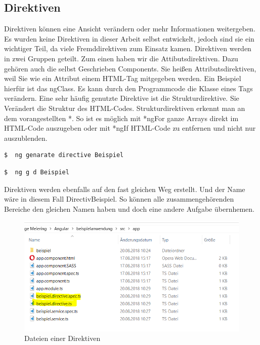 \subsection{Direktiven}
Direktiven können eine Ansicht verändern oder mehr Informationen weitergeben. Es wurden keine Direktiven in dieser Arbeit selbst entwickelt, jedoch sind sie ein wichtiger Teil, da viele Fremddirektiven zum Einsatz kamen. Direktiven werden in zwei Gruppen geteilt. Zum einen haben wir die Attibutsdirektiven. Dazu gehören auch die selbst Geschrieben Components. Sie heißen Attributsdirektiven, weil Sie wie ein Attribut einem \ac{HTML}-Tag mitgegeben werden. Ein Beispiel hierfür ist das ngClass. Es kann durch den Programmcode die Klasse eines Tags verändern. Eine sehr häufig genutzte Direktive ist die Strukturdirektive. Sie Verändert die Struktur des \ac{HTML}-Codes. Strukturdirektiven erkennt man an dem vorangestellten *. So ist es möglich mit *ngFor ganze Arrays direkt im \ac{HTML}-Code auszugeben oder mit *ngIf \ac{HTML}-Code zu entfernen und nicht nur auszublenden. \autocite{Clow.2018}

\begin{lstlisting}[language=sh, frame=single]
$  ng genarate directive Beispiel
\end{lstlisting} 

\begin{lstlisting}[language=sh, frame=single]
$  ng g d Beispiel
\end{lstlisting}

Direktiven werden ebenfalls auf den fast gleichen Weg erstellt. Und der Name wäre in diesem Fall DirectivBeispiel. So können alle zusammengehörenden Bereiche den gleichen Namen haben und doch eine andere Aufgabe übernhemen.

\begin{figure}[H]
	\centering
	\includegraphics[scale=0.9]{content/pictures/directive.png}
	\caption{ Dateien einer Direktiven}
	\label{fig:directive}
\end{figure}





